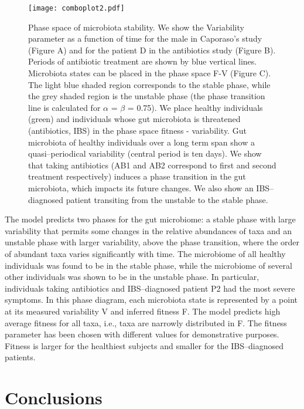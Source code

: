 \documentclass[11pt,oneside,letterpaper]{article}
\begin{document}
\begin{figure}[!ht]
\texttt{[image: comboplot2.pdf]}
\caption{Phase space of microbiota stability. We show the Variability parameter as a function of time for the male in Caporaso's study\cite{moving} (Figure A) and for the patient D in the antibiotics study\cite{antibiotic} (Figure B). Periods of antibiotic treatment are shown by blue vertical lines. Microbiota states can be placed in the phase space F-V (Figure C). The light blue shaded region corresponds to the stable phase, while the grey shaded region is the unstable phase (the phase transition line is calculated for  $\alpha$ = $\beta$ = 0.75). We place healthy individuals (green) and individuals whose gut microbiota is threatened (antibiotics, IBS) in the phase space fitness - variability. Gut microbiota of healthy individuals over a long term span show a quasi--periodical variability (central period is ten days). We show that taking antibiotics (AB1 and AB2 correspond to first and second treatment respectively) induces a phase transition in the gut microbiota, which impacts its future changes. We also show an IBS--diagnosed patient transiting from the unstable to the stable phase.}
\end{figure}


The model predicts two phases for the gut microbiome: a stable phase with large variability that permits some changes in the relative abundances of taxa and an unstable phase with larger variability, above the phase transition, where the order of abundant taxa varies significantly with time. The microbiome of all healthy individuals was found to be in the stable phase, while the microbiome of several other individuals was shown to be in the unstable phase. In particular, individuals taking antibiotics and IBS--diagnosed patient P2 had the most severe symptoms. In this phase diagram, each microbiota state is represented by a point at its measured variability V and inferred fitness F. The model predicts high average fitness for all taxa, i.e., taxa are narrowly distributed in F. The fitness parameter has been chosen with different values for demonstrative purposes. Fitness is larger for the healthiest subjects and smaller for the IBS--diagnosed patients.  

\section*{Conclusions}
\end{document}
